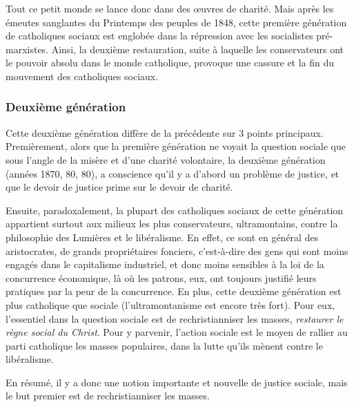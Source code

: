\documentclass[12pt]{report}
\begin{document}

Tout ce petit monde se lance donc dans des œuvres de charité. Mais après les émeutes sanglantes du Printemps des peuples de 1848, cette première génération de catholiques sociaux est englobée dans la répression avec les socialistes pré-marxistes.
Ainsi, la deuxième restauration, suite à laquelle les conservateurs ont le pouvoir absolu dans le monde catholique, provoque une cassure et la fin du mouvement des catholiques sociaux.

\subsubsection{Deuxième génération}


Cette deuxième génération diffère de la précédente sur 3 points principaux.
Premièrement, alors que la première génération ne voyait la question sociale que sous l'angle de la misère et d'une charité volontaire, la deuxième génération (années 1870, 80, 80), a conscience qu'il y a d'abord un problème de justice, et que le devoir de justice prime sur le devoir de charité.

Ensuite, paradoxalement, la plupart des catholiques sociaux de cette génération appartient surtout aux milieux les plus conservateurs, ultramontains, contre la philosophie des Lumières et le libéralisme.
En effet, ce sont en général des aristocrates, de grands propriétaires fonciers, c'est-à-dire des gens qui sont moins engagés dans le capitalisme industriel, et donc moins sensibles à la loi de la concurrence économique, là où les patrons, eux, ont toujours justifié leurs pratiques par la peur de la concurrence.
En plus, cette deuxième génération est plus catholique que sociale (l'ultramontanisme est encore très fort). Pour eux, l'essentiel dans la question sociale est de rechristianniser les masses, \emph{restaurer le règne social du Christ}. Pour y parvenir, l'action sociale est le moyen de rallier au parti catholique les masses populaires, dans la lutte qu'ils mènent contre le libéralisme.

En résumé, il y a donc une notion importante et nouvelle de justice sociale, mais le but premier est de rechristianniser les masses.
\end{document}
